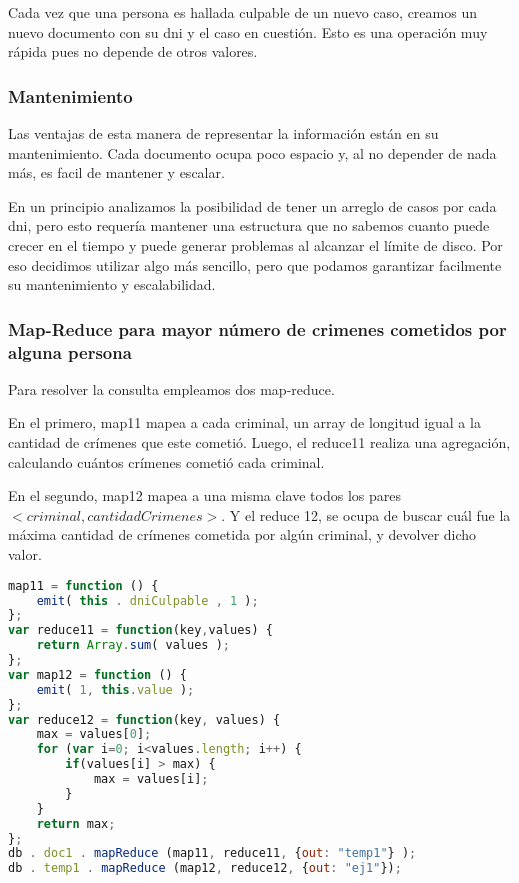 \documentclass[11pt, a4paper]{article}
\begin{document}
Cada vez que una persona es hallada culpable de un nuevo caso, creamos un nuevo documento con su dni y el caso en cuesti\'on. Esto es una operaci\'on muy r\'apida pues no depende de otros valores.

\subsubsection{Mantenimiento}

Las ventajas de esta manera de representar la informaci\'on est\'an en su mantenimiento. Cada documento ocupa poco espacio y, al no depender de nada m\'as, es facil de mantener y escalar. \

En un principio analizamos la posibilidad de tener un arreglo de casos por cada dni, pero esto requer\'ia mantener una estructura que no sabemos cuanto puede crecer en el tiempo y puede generar problemas al alcanzar el límite de disco. Por eso decidimos utilizar algo m\'as sencillo, pero que podamos garantizar facilmente su mantenimiento y escalabilidad.

\subsubsection{Map-Reduce para mayor número de crimenes cometidos por alguna persona}

Para resolver la consulta empleamos dos map-reduce. 

En el primero, map11 mapea a cada criminal, un array de longitud igual a la cantidad de crímenes que este cometió. Luego, el reduce11 realiza una agregación, calculando cuántos crímenes cometió cada criminal.

En el segundo, map12 mapea a una misma clave todos los pares $<criminal, cantidadCrimenes>$. Y el reduce 12, se ocupa de buscar cuál fue la máxima cantidad de crímenes cometida por algún criminal, y devolver dicho valor.

\begin{lstlisting}[language=JavaScript]
map11 = function () {
    emit( this . dniCulpable , 1 ); 
};
var reduce11 = function(key,values) {
    return Array.sum( values ); 
};
var map12 = function () {
    emit( 1, this.value );  
};
var reduce12 = function(key, values) {
    max = values[0];
    for (var i=0; i<values.length; i++) {
        if(values[i] > max) {
            max = values[i];
        }
    }
    return max;
};
db . doc1 . mapReduce (map11, reduce11, {out: "temp1"} );
db . temp1 . mapReduce (map12, reduce12, {out: "ej1"});
\end{lstlisting}
\end{document}
